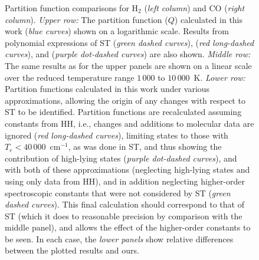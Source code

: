 \documentclass[traditabstract]{aa} %
\begin{document}
\begin{figure}
{	}
      \caption{Partition function comparisons for  H$_2$ (\emph{left column}) and CO (\emph{right column}).  \emph{Upper row:}  The partition function ($Q$) calculated in this work (\emph{blue curves}) shown on a logarithmic scale.  Results from polynomial expressions of ST (\emph{green dashed curves}), \cite{1987A&A...182..348I} (\emph{red long-dashed curves}), and \cite{2000JMoSt.517..407G} (\emph{purple dot-dashed curves}) are also shown.  \emph{Middle row:}  The same results as for the upper panels are shown on a linear scale over the reduced temperature range $1\,000$ to $10\,000$~K.   \emph{Lower row:} Partition functions calculated in this work under various approximations, allowing the origin of any changes with respect to ST to be identified.  Partition functions are recalculated assuming constants from HH, i.e., changes and additions to molecular data are ignored (\emph{red long-dashed curves}), limiting states to those with $T_e < 40\,000$~cm$^{-1}$, as was done in ST, and thus showing the contribution of high-lying states (\emph{purple dot-dashed curves}), and with both of these approximations (neglecting high-lying states and using only data from HH), and in addition neglecting higher-order spectroscopic constants that were not considered by ST (\emph{green dashed curves}).  This final calculation should correspond to that of ST (which it does to reasonable precision by comparison with the middle panel), and allows the effect of the higher-order constants to be seen.  In each case, the \emph{lower panels} show relative differences between the plotted results and ours.
              }
         \label{fig:molpart}
   \end{figure}
 
\end{document}
